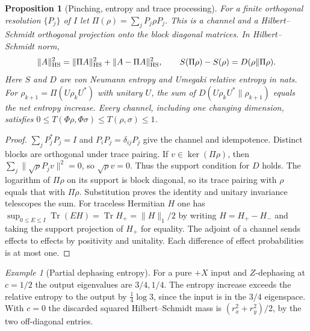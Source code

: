 \documentclass[aps,pra,onecolumn,superscriptaddress,nofootinbib,10pt]{revtex4-2}
\newtheorem{proposition}[theorem]{Proposition}
\theoremstyle{definition}
\theoremstyle{remark}
\newtheorem{example}[theorem]{Example}
\newcommand{\tr}{\operatorname{Tr}}
\begin{document}
\begin{proposition}[Pinching, entropy and trace processing]\label{ob:pinching}
For a finite orthogonal resolution $\{P_j\}$ of $I$ let
$\Pi(\rho)=\sum_jP_j\rho P_j$. This is a channel and a
Hilbert--Schmidt orthogonal projection onto the block diagonal matrices.
In Hilbert--Schmidt norm,
\[
 \|A\|_{\rm HS}^2=\|\Pi A\|_{\rm HS}^2+\|A-\Pi A\|_{\rm HS}^2,\qquad
 S(\Pi\rho)-S(\rho)=D(\rho\|\Pi\rho).
\]
Here $S$ and $D$ are von Neumann entropy and Umegaki relative entropy
in nats. For $\rho_{k+1}=\Pi(U\rho_kU^*)$ with unitary $U$, the sum
of $D(U\rho_kU^*\|\rho_{k+1})$ equals the net entropy increase.
Every channel, including one changing dimension, satisfies
$0\le T(\Phi\rho,\Phi\sigma)\le T(\rho,\sigma)\le1$.
\end{proposition}
\begin{proof}
$\sum_jP_j^*P_j=I$ and $P_iP_j=\delta_{ij}P_j$ give the channel
and idempotence. Distinct blocks are orthogonal under trace pairing.
If $v\in\ker(\Pi\rho)$, then $\sum_j\|\sqrt\rho P_jv\|^2=0$,
so $\sqrt\rho v=0$. Thus the support condition for $D$ holds.
The logarithm of $\Pi\rho$ on its support is block diagonal, so
its trace pairing with $\rho$ equals that with $\Pi\rho$.
Substitution proves the identity and unitary invariance telescopes
the sum. For traceless Hermitian $H$ one has
$\sup_{0\le E\le I}\tr(EH)=\tr H_+=\|H\|_1/2$ by writing
$H=H_+-H_-$ and taking the support projection of $H_+$ for equality.
The adjoint of a channel sends effects to effects by positivity
and unitality. Each difference of effect probabilities is at most one.
\end{proof}

\begin{example}[Partial dephasing entropy]\label{ob:partialentropy}
For a pure $+X$ input and $Z$-dephasing at $c=1/2$ the output
eigenvalues are $3/4,1/4$. The entropy increase exceeds the relative
entropy to the output by $\tfrac14\log3$, since the input is in
the $3/4$ eigenspace. With $c=0$ the discarded squared
Hilbert--Schmidt mass is $(r_x^2+r_y^2)/2$, by the two off-diagonal entries.
\end{example}
\end{document}
